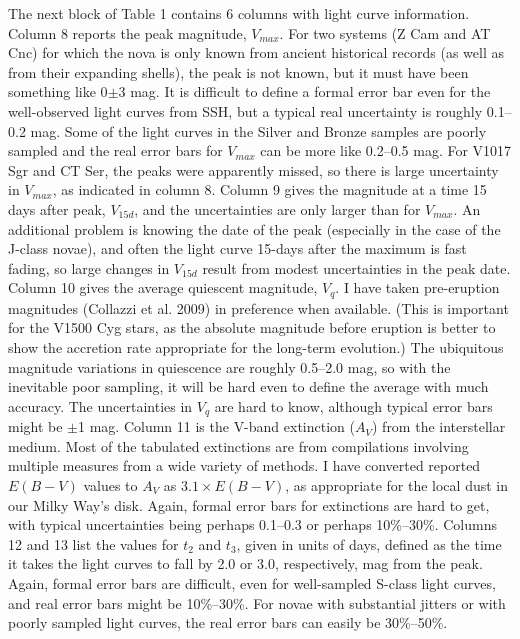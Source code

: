 \documentclass[a4paper,fleqn,usenatbib]{mnras}
\begin{document}
The next block of Table 1 contains 6 columns with light curve information.  Column 8 reports the peak magnitude, $V_{max}$.  For two systems (Z Cam and AT Cnc) for which the nova is only known from ancient historical records (as well as from their expanding shells), the peak is not known, but it must have been something like 0$\pm$3 mag.  It is difficult to define a formal error bar even for the well-observed light curves from SSH, but a typical real uncertainty is roughly 0.1--0.2 mag.  Some of the light curves in the Silver and Bronze samples are poorly sampled and the real error bars for $V_{max}$ can be more like 0.2--0.5 mag.  For V1017 Sgr and CT Ser, the peaks were apparently missed, so there is large uncertainty in $V_{max}$, as indicated in column 8.  Column 9 gives the magnitude at a time 15 days after peak, $V_{15d}$, and the uncertainties are only larger than for $V_{max}$.  An additional problem is knowing the date of the peak (especially in the case of the J-class novae), and often the light curve 15-days after the maximum is fast fading, so large changes in $V_{15d}$ result from modest uncertainties in the peak date.  Column 10 gives the average quiescent magnitude, $V_q$.  I have taken pre-eruption magnitudes (Collazzi et al. 2009) in preference when available.  (This is important for the V1500 Cyg stars, as the absolute magnitude before eruption is better to show the accretion rate appropriate for the long-term evolution.)  The ubiquitous magnitude variations in quiescence are roughly 0.5--2.0 mag, so with the inevitable poor sampling, it will be hard even to define the average with much accuracy.  The uncertainties in $V_q$ are hard to know, although typical error bars might be $\pm$1 mag.  Column 11 is the V-band extinction ($A_V$) from the interstellar medium.  Most of the tabulated extinctions are from compilations involving multiple measures from a wide variety of methods.  I have converted reported $E(B-V)$ values to $A_V$ as $3.1\times E(B-V)$, as appropriate for the local dust in our Milky Way's disk.  Again, formal error bars for extinctions are hard to get, with typical uncertainties being perhaps 0.1--0.3 or perhaps 10\%--30\%.  Columns 12 and 13 list the values for $t_2$ and $t_3$, given in units of days, defined as the time it takes the light curves to fall by 2.0 or 3.0, respectively, mag from the peak.  Again, formal error bars are difficult, even for well-sampled S-class light curves, and real error bars might be 10\%--30\%.  For novae with substantial jitters or with poorly sampled light curves, the real error bars can easily be 30\%--50\%.
\end{document}
